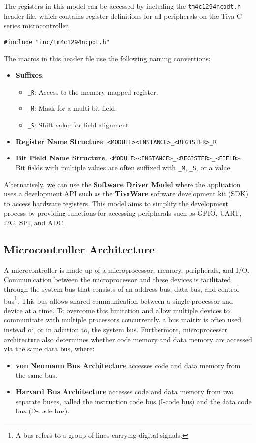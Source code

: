 \documentclass{article}
\begin{document}
The registers in this model can be accessed by including the
\texttt{tm4c1294ncpdt.h} header file, which contains register
definitions for all peripherals on the Tiva C series microcontroller.
\begin{verbatim}
#include "inc/tm4c1294ncpdt.h"
\end{verbatim}
The macros in this header file use the following naming conventions:
\begin{itemize}
    \item \textbf{Suffixes}:
          \begin{itemize}
              \item \texttt{_R}: Access to the memory-mapped register.
              \item \texttt{_M}: Mask for a multi-bit field.
              \item \texttt{_S}: Shift value for field alignment.
          \end{itemize}
    \item \textbf{Register Name Structure}: \texttt{<MODULE><INSTANCE>_<REGISTER>_R}
    \item \textbf{Bit Field Name Structure}: \texttt{<MODULE><INSTANCE>_<REGISTER>_<FIELD>}. Bit fields
          with multiple values are often suffixed with \texttt{_M}, \texttt{_S}, or a value.
\end{itemize}
Alternatively, we can use the \textbf{Software Driver Model} where the
application uses a development API such as the \textbf{TivaWare}
software development kit (SDK) to access hardware registers. This model
aims to simplify the development process by providing functions for
accessing peripherals such as GPIO, UART, I2C, SPI, and ADC.
\subsection{Microcontroller Architecture}
A microcontroller is made up of a microprocessor, memory, peripherals,
and I/O. Communication between the microprocessor and these devices is
facilitated through the system bus that consists of an address bus,
data bus, and control bus\footnote{A bus refers to a group of lines
carrying digital signals.}. This bus allows shared communication
between a single processor and device at a time. To overcome this
limitation and allow multiple devices to communicate with multiple
processors concurrently, a bus matrix is often used instead of, or in
addition to, the system bus. Furthermore, microprocessor architecture
also determines whether code memory and data memory are accessed via
the same data bus, where:
\begin{itemize}
    \item \textbf{von Neumann Bus Architecture} accesses code and data memory from the same bus.
    \item \textbf{Harvard Bus Architecture} accesses code and data memory from two separate buses, called the instruction code bus (I-code bus) and the data code bus (D-code bus).
\end{itemize}
\end{document}
